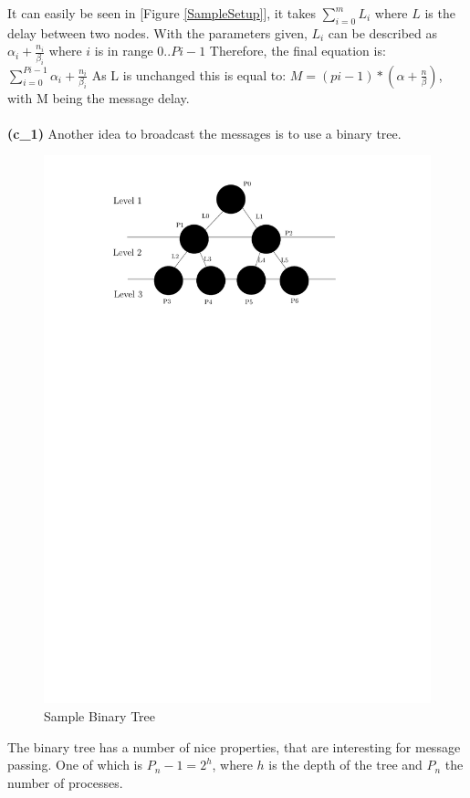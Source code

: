 \documentclass[a4paper,twoside,11pt]{article}
\begin{document}
It can easily be seen in [Figure \ref{SampleSetup}], it takes $\sum\limits_{i=0}^m L_i$ where $L$ is the delay between two nodes.
With the parameters given, $L_i$ can be described as $\alpha_i + \frac{n_i}{\beta_i}$ where $i$ is in range $0 .. Pi-1$
Therefore, the final equation is: $\sum\limits_{i=0}^{Pi-1} \alpha_i + \frac{n_i}{\beta_i}$
As L is unchanged this is equal to: $M = (pi-1) * (\alpha + \frac{n}{\beta})$, with M being the message delay.
\\\\
\textbf{(c\_1)}\hspace{1em} Another idea to broadcast the messages is to use a binary tree.
\begin{figure}[!htbp]
    \begin{center}
        \includegraphics[scale=1]{3c_1.pdf}
    \end{center}
    \caption{Sample Binary Tree}
    \label{BinTree}
\end{figure}
The binary tree has a number of nice properties, that are interesting for message passing.
One of which is $P_n-1=2^h$, where  $h$ is the depth of the tree and $P_n$ the number of processes.
\end{document}
